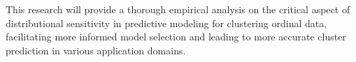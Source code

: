 \documentclass{article}
\begin{document}
This research will provide a thorough empirical analysis on the critical aspect of distributional sensitivity in predictive modeling for clustering ordinal data, facilitating more informed model selection and leading to more accurate cluster prediction in various application domains.





\printbibliography
\end{document}
